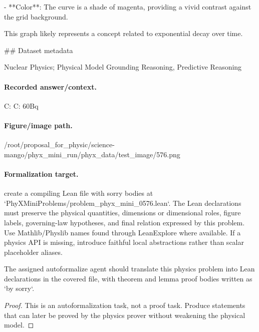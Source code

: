 - **Color**: The curve is a shade of magenta, providing a vivid contrast against the grid background.

This graph likely represents a concept related to exponential decay over time.

\#\# Dataset metadata

Nuclear Physics; Physical Model Grounding Reasoning, Predictive Reasoning

\paragraph{Recorded answer/context.}
C: C: 60Bq

\paragraph{Figure/image path.}
/root/proposal\_for\_physic/science-mango/phyx\_mini\_run/phyx\_data/test\_image/576.png

\paragraph{Formalization target.}
create a compiling Lean file with sorry bodies at `PhyXMiniProblems/problem\_phyx\_mini\_0576.lean`. The Lean declarations must preserve the physical quantities, dimensions or dimensional roles, figure labels, governing-law hypotheses, and final relation expressed by this problem.
Use Mathlib/Physlib names found through LeanExplore where available. If a physics API is missing, introduce faithful local abstractions rather than scalar placeholder aliases.

\begin{theorem}
\label{thm:physics:phyx_mini_0576:target}
The assigned autoformalize agent should translate this physics problem into Lean declarations in the covered file, with theorem and lemma proof bodies written as `by sorry`.
\end{theorem}
\begin{proof}
This is an autoformalization task, not a proof task. Produce statements that can later be proved by the physics prover without weakening the physical model.
\end{proof}

